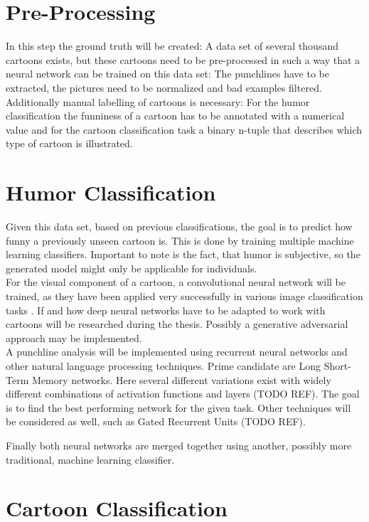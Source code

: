 \documentclass[draft,final,oneside]{vutinfth} %
\begin{document}
\section {Pre-Processing}
In this step the ground truth will be created: A data set of several thousand cartoons exists, but these cartoons need to be pre-processed in such a way that a neural network can be trained on this data set: The punchlines have to be extracted, the pictures need to be normalized and bad examples filtered. Additionally manual labelling of cartoons is necessary: For the humor classification the funniness of a cartoon has to be annotated with a numerical value and for the cartoon classification task a binary n-tuple that describes which type of cartoon is illustrated. \\

\section {Humor Classification}
Given this data set, based on previous classifications, the goal is to predict how funny a previously unseen cartoon is. This is done by training multiple machine learning classifiers. Important to note is the fact, that humor is subjective, so the generated model might only be applicable for individuals. \\

For the visual component of a cartoon, a convolutional neural network will be trained, as they have been applied very successfully in various image classification tasks \cite{dogsvscats}. If and how deep neural networks have to be adapted to work with cartoons will be researched during the thesis. Possibly a generative adversarial approach may be implemented. \cite{gan}  \\

A punchline analysis will be implemented using recurrent neural networks and other natural language processing techniques. Prime candidate are Long Short-Term Memory networks. Here several different variations exist with widely different combinations of activation functions and layers (TODO REF). The goal is to find the best performing network for the given task. Other techniques will be considered as well, such as Gated Recurrent Units (TODO REF).

Finally both neural networks are merged together using another, possibly more traditional, machine learning classifier. \\

\section {Cartoon Classification}
\end{document}
